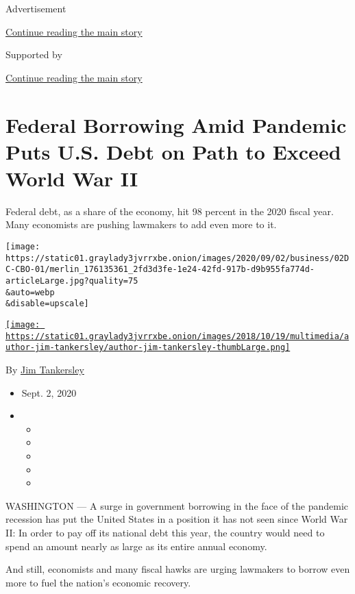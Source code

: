 Advertisement

\protect\hyperlink{after-top}{Continue reading the main story}

Supported by

\protect\hyperlink{after-sponsor}{Continue reading the main story}

\hypertarget{federal-borrowing-amid-pandemic-puts-us-debt-on-path-to-exceed-world-war-ii}{%
\section{Federal Borrowing Amid Pandemic Puts U.S. Debt on Path to
Exceed World War
II}\label{federal-borrowing-amid-pandemic-puts-us-debt-on-path-to-exceed-world-war-ii}}

Federal debt, as a share of the economy, hit 98 percent in the 2020
fiscal year. Many economists are pushing lawmakers to add even more to
it.

\texttt{[image: https://static01.graylady3jvrrxbe.onion/images/2020/09/02/business/02DC-CBO-01/merlin\_176135361\_2fd3d3fe-1e24-42fd-917b-d9b955fa774d-articleLarge.jpg?quality=75\\\&auto=webp\\\&disable=upscale]}

\href{https://www.nytimes3xbfgragh.onion/by/jim-tankersley}{\texttt{[image: https://static01.graylady3jvrrxbe.onion/images/2018/10/19/multimedia/author-jim-tankersley/author-jim-tankersley-thumbLarge.png]}}

By \href{https://www.nytimes3xbfgragh.onion/by/jim-tankersley}{Jim
Tankersley}

\begin{itemize}
\item
  Sept. 2, 2020
\item
  \begin{itemize}
  \item
  \item
  \item
  \item
  \item
  \end{itemize}
\end{itemize}

WASHINGTON --- A surge in government borrowing in the face of the
pandemic recession has put the United States in a position it has not
seen since World War II: In order to pay off its national debt this
year, the country would need to spend an amount nearly as large as its
entire annual economy.

And still, economists and many fiscal hawks are urging lawmakers to
borrow even more to fuel the nation's economic recovery.


